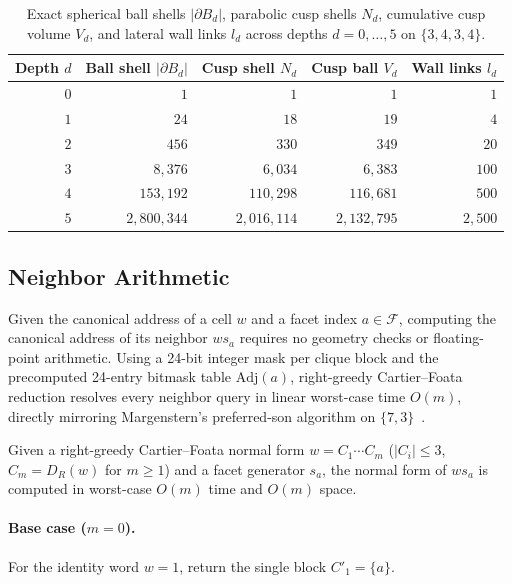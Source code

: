 \begin{table}[tb]
\centering
\caption{Exact spherical ball shells $|\partial B_d|$, parabolic cusp shells $N_d$, cumulative cusp volume $V_d$, and lateral wall links $l_d$ across depths $d = 0,\dots,5$ on $\{3,4,3,4\}$.}
\label{tab:shell-counts}
\small
\begin{tabular}{@{}rrrrr@{}}
\toprule
Depth $d$ & Ball shell $|\partial B_d|$ & Cusp shell $N_d$ & Cusp ball $V_d$ & Wall links $l_d$ \\
\midrule
$0$ & $1$ & $1$ & $1$ & $1$ \\
$1$ & $24$ & $18$ & $19$ & $4$ \\
$2$ & $456$ & $330$ & $349$ & $20$ \\
$3$ & $8{,}376$ & $6{,}034$ & $6{,}383$ & $100$ \\
$4$ & $153{,}192$ & $110{,}298$ & $116{,}681$ & $500$ \\
$5$ & $2{,}800{,}344$ & $2{,}016{,}114$ & $2{,}132{,}795$ & $2{,}500$ \\
\bottomrule
\end{tabular}
\end{table}

\subsection{Neighbor Arithmetic}
\label{subsec:neighbor-arithmetic}

Given the canonical address of a cell $w$ and a facet index $a \in \mathcal{F}$, computing the canonical address of its neighbor $w s_a$ requires no geometry checks or floating-point arithmetic. Using a 24-bit integer mask per clique block and the precomputed 24-entry bitmask table $\mathrm{Adj}(a)$, right-greedy Cartier--Foata reduction resolves every neighbor query in linear worst-case time $O(m)$, directly mirroring Margenstern's preferred-son algorithm on $\{7,3\}$~\cite{margenstern2016coords}.

\begin{proposition}
\label{prop:neighbor-lookup}
Given a right-greedy Cartier--Foata normal form $w = C_1 \cdots C_m$ ($|C_i| \le 3$, $C_m = D_R(w)$ for $m \ge 1$) and a facet generator $s_a$, the normal form of $w s_a$ is computed in worst-case $O(m)$ time and $O(m)$ space.
\end{proposition}

\paragraph{Base case ($m = 0$).}
For the identity word $w = 1$, return the single block $C'_1 = \{a\}$.

